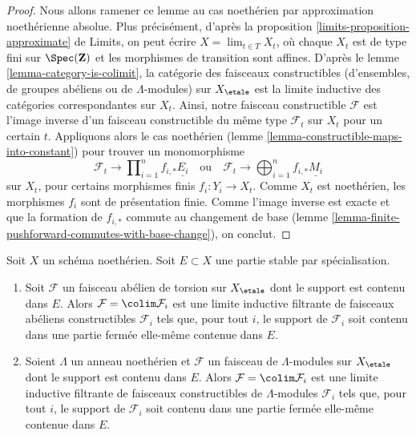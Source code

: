 \begin{proof}
Nous allons ramener ce lemme au cas noethérien par approximation noethérienne
absolue. Plus précisément, d'après la
proposition \ref{limits-proposition-approximate} de Limits,
on peut écrire $X = \lim_{t \in T} X_t$, où chaque $X_t$ est de type fini sur
$\Spec(\mathbf{Z})$ et les morphismes de transition sont affines. D'après le
lemme \ref{lemma-category-is-colimit},
la catégorie des faisceaux constructibles (d'ensembles, de groupes abéliens ou de
$\Lambda$-modules) sur $X_\etale$ est la limite inductive des
catégories correspondantes sur $X_t$. Ainsi, notre faisceau constructible $\mathcal{F}$
est l'image inverse d'un faisceau constructible du même type $\mathcal{F}_t$
sur $X_t$ pour un certain $t$. Appliquons alors le cas noethérien
(lemme \ref{lemma-constructible-maps-into-constant})
pour trouver un monomorphisme
$$
\mathcal{F}_t \longrightarrow
\prod\nolimits_{i = 1}^n f_{i, *}\underline{E_i}
\quad\text{ou}\quad
\mathcal{F}_t \longrightarrow
\bigoplus\nolimits_{i = 1}^n f_{i, *}\underline{M_i}
$$
sur $X_t$, pour certains morphismes finis $f_i : Y_i \to X_t$.
Comme $X_t$ est noethérien, les morphismes $f_i$ sont de présentation finie.
Comme l'image inverse est exacte et que la formation de $f_{i, *}$ commute
au changement de base
(lemme \ref{lemma-finite-pushforward-commutes-with-base-change}), on conclut.
\end{proof}

\begin{lemma}
\label{lemma-support-in-subset}
Soit $X$ un schéma noethérien. Soit $E \subset X$ une partie stable
par spécialisation.
\begin{enumerate}
\item Soit $\mathcal{F}$ un faisceau abélien de torsion sur $X_\etale$
dont le support est contenu dans $E$. Alors $\mathcal{F} = \colim \mathcal{F}_i$
est une limite inductive filtrante de faisceaux abéliens constructibles $\mathcal{F}_i$
tels que, pour tout $i$, le support de $\mathcal{F}_i$ soit contenu dans
une partie fermée elle-même contenue dans $E$.
\item Soient $\Lambda$ un anneau noethérien et $\mathcal{F}$ un faisceau
de $\Lambda$-modules sur $X_\etale$ dont le support est contenu dans $E$.
Alors $\mathcal{F} = \colim \mathcal{F}_i$
est une limite inductive filtrante de faisceaux constructibles de
$\Lambda$-modules $\mathcal{F}_i$ tels que, pour tout $i$,
le support de $\mathcal{F}_i$ soit contenu dans une partie fermée
elle-même contenue dans $E$.
\end{enumerate}
\end{lemma}

